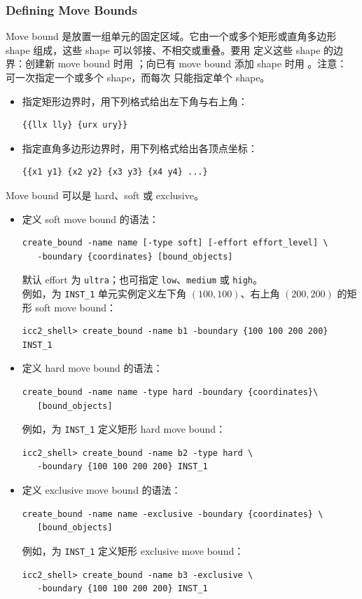 \subsubsection*{Defining Move Bounds}

Move bound 是放置一组单元的固定区域。它由一个或多个矩形或直角多边形 shape 组成，这些 shape 可以邻接、不相交或重叠。要用  定义这些 shape 的边界：创建新 move bound 时用 ；向已有 move bound 添加 shape 时用 。注意： 可一次指定一个或多个 shape，而每次  只能指定单个 shape。

\begin{itemize}
  \item 指定矩形边界时，用下列格式给出左下角与右上角：
\begin{lstlisting}
{{llx lly} {urx ury}}
\end{lstlisting}
  \item 指定直角多边形边界时，用下列格式给出各顶点坐标：
\begin{lstlisting}
{{x1 y1} {x2 y2} {x3 y3} {x4 y4} ...}
\end{lstlisting}
\end{itemize}

Move bound 可以是 hard、soft 或 exclusive。
\begin{itemize}
  \item 定义 soft move bound 的语法：
\begin{lstlisting}
create_bound -name name [-type soft] [-effort effort_level] \
   -boundary {coordinates} [bound_objects]
\end{lstlisting}
    默认 effort 为 \texttt{ultra}；也可指定 \texttt{low}、\texttt{medium} 或 \texttt{high}。\\
    例如，为 \texttt{INST\_1} 单元实例定义左下角 $(100, 100)$、右上角 $(200, 200)$ 的矩形 soft move bound：
\begin{lstlisting}
icc2_shell> create_bound -name b1 -boundary {100 100 200 200} INST_1
\end{lstlisting}

  \item 定义 hard move bound 的语法：
\begin{lstlisting}
create_bound -name name -type hard -boundary {coordinates}\
   [bound_objects]
\end{lstlisting}
    例如，为 \texttt{INST\_1} 定义矩形 hard move bound：
\begin{lstlisting}
icc2_shell> create_bound -name b2 -type hard \
   -boundary {100 100 200 200} INST_1
\end{lstlisting}

  \item 定义 exclusive move bound 的语法：
\begin{lstlisting}
create_bound -name name -exclusive -boundary {coordinates} \
   [bound_objects]
\end{lstlisting}
    例如，为 \texttt{INST\_1} 定义矩形 exclusive move bound：
\begin{lstlisting}
icc2_shell> create_bound -name b3 -exclusive \
   -boundary {100 100 200 200} INST_1
\end{lstlisting}
\end{itemize}

